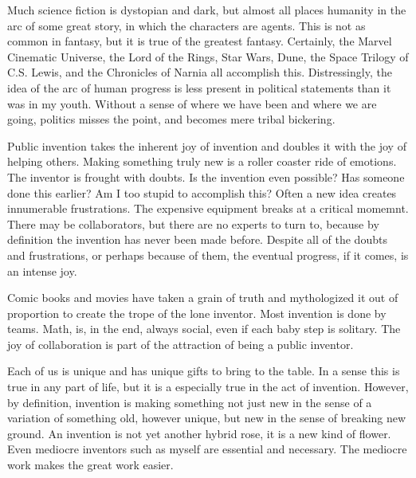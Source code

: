 \documentclass[
	fontsize=10pt, %
	twoside=false, %
	secnumdepth=1, %
]{kaobook}
\begin{document}
Much science fiction is dystopian and dark, but almost all
places humanity in the arc of some great story,
in which the characters are agents.
This is not as common in fantasy, but it is true of the
greatest fantasy.
Certainly, the Marvel Cinematic Universe, the Lord of the Rings,
Star Wars, Dune, the Space Trilogy of C.S. Lewis,
and the Chronicles of Narnia all accomplish this.
Distressingly, the idea of the arc of human progress is
less present in political statements
than it was in my youth.
Without a sense of where we have been and where we are going,
politics misses the point, and becomes mere tribal bickering.

Public invention takes the inherent joy of invention and doubles
it with the joy of helping others.
Making something truly new is a roller coaster ride
of emotions.
The inventor is frought with doubts.
Is the invention even possible?
Has someone done this earlier?
Am I too stupid to accomplish this?
Often a new idea creates innumerable frustrations.
The expensive equipment breaks at a critical momemnt.
There may be collaborators,
but there are no experts to turn to, because by definition
the invention has never been made before.
Despite all of the doubts and frustrations, or
perhaps because of them, the eventual progress, if it
comes, is an intense joy.

Comic books and movies have taken a grain of truth
and mythologized it out of proportion to create the trope
of the lone inventor.
Most invention is done by teams.
Math, is, in the end, always social, even if each baby step is solitary.
The joy of collaboration is part of the attraction
of being a public inventor.

Each of us is unique and has unique gifts to bring
to the table.
In a sense this is true in any part of life,
but it is a especially true in the act of invention.
However, by definition, invention is making something
not just new in the sense of a variation of something
old, however unique, but new in the sense of breaking new
ground.
An invention is not yet another hybrid rose, it is a new kind of flower.
Even mediocre inventors such as myself are essential and necessary.
The mediocre work makes the great work easier.
\end{document}

